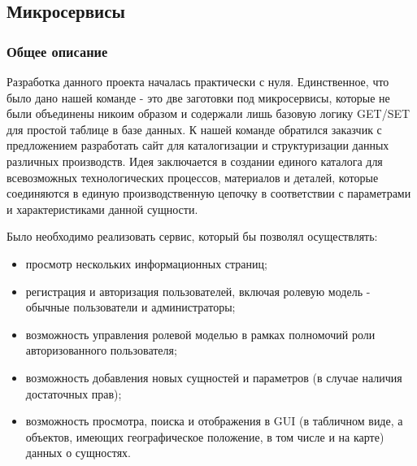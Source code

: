     \subsection{Микросервисы}
    
    \subsubsection{Общее описание}
    Разработка данного проекта началась практически с нуля. Единственное, что было дано нашей команде - это две заготовки под микросервисы, которые не были объединены никоим образом и содержали лишь базовую логику GET/SET для простой таблице в базе данных. К нашей команде обратился заказчик с предложением разработать сайт для каталогизации и структуризации данных различных производств. Идея заключается в создании единого каталога для всевозможных технологических процессов, материалов и деталей, которые соединяются в единую производственную цепочку в соответствии с параметрами и характеристиками данной сущности.

    Было необходимо реализовать сервис, который бы позволял осуществлять:
    \begin{itemize}
      \item просмотр нескольких информационных страниц;
      \item регистрация и авторизация пользователей, включая ролевую модель - обычные пользователи и администраторы;
      \item возможность управления ролевой моделью в рамках полномочий роли авторизованного пользователя; 
      \item возможность добавления новых сущностей и параметров (в случае наличия достаточных прав);
      \item возможность просмотра, поиска и отображения в GUI (в табличном виде, а объектов, имеющих географическое положение, в том числе и на карте) данных о сущностях.
    \end{itemize}

